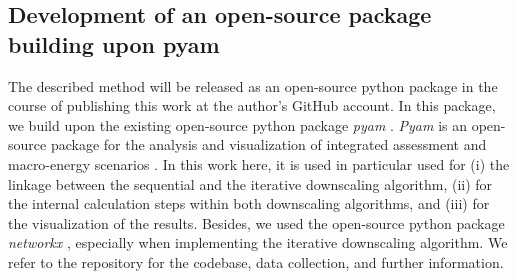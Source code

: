 \subsection{Development of an open-source package building upon pyam}\label{open}
The described method will be released as an open-source python package in the course of publishing this work at the author's GitHub account. In this package, we build upon the existing open-source python package \textit{pyam} \cite{gidden2019pyam}. \textit{Pyam} is an open-source package for the analysis and visualization of integrated assessment and macro-energy scenarios \cite{huppmann2021pyam}. In this work here, it is used in particular used for (i) the linkage between the sequential and the iterative downscaling algorithm, (ii) for the internal calculation steps within both downscaling algorithms, and (iii) for the visualization of the results. Besides, we used the open-source python package \textit{networkx} \cite{hagberg2008exploring}, especially when implementing the iterative downscaling algorithm. We refer to the repository for the codebase, data collection, and further information. 
